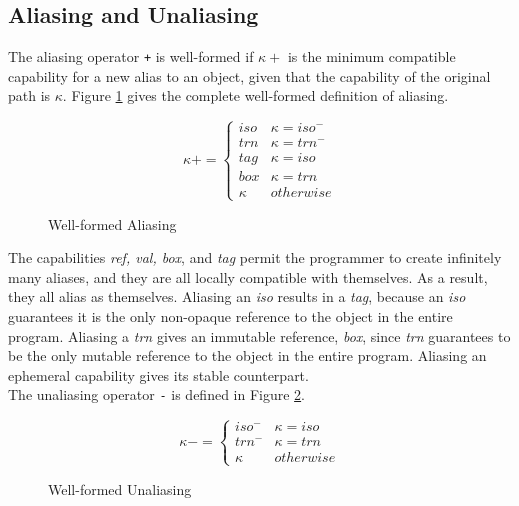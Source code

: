 \subsection{Aliasing and Unaliasing}

The aliasing operator \texttt{+} is well-formed if $\kappa+$ is the minimum compatible capability for a new alias to an object, given that the capability of the original path is $\kappa$. Figure \ref{fig:degen-alias} gives the complete well-formed definition of aliasing.

\begin{figure}[H]
    \centering
    \[ \kappa+ = \begin{cases}
        \textit{iso} & \kappa = \textit{iso}^- \\
        \textit{trn} & \kappa = \textit{trn}^- \\
        \textit{tag} & \kappa = \textit{iso} \\
        \textit{box} & \kappa = \textit{trn} \\
        \kappa & otherwise
       \end{cases}
    \]
    \caption{Well-formed Aliasing}
    \label{fig:degen-alias}
\end{figure}

The capabilities \textit{ref, val, box}, and \textit{tag} permit the programmer to create infinitely many aliases, and they are all locally compatible with themselves. As a result, they all alias as themselves. Aliasing an \textit{iso} results in a \textit{tag}, because an \textit{iso} guarantees it is the only non-opaque reference to the object in the entire program. Aliasing a \textit{trn} gives an immutable reference, \textit{box}, since \textit{trn} guarantees to be the only mutable reference to the object in the entire program. Aliasing an ephemeral capability gives its stable counterpart. \\

The unaliasing operator \texttt{-} is defined in Figure \ref{fig:degen-unalias}. 

\begin{figure}[H]
    \centering
    \[ \kappa- = \begin{cases}
        \textit{iso}^- & \kappa = \textit{iso} \\
        \textit{trn}^- & \kappa = \textit{trn} \\
        \kappa & otherwise
       \end{cases}
    \]
    \caption{Well-formed Unaliasing}
    \label{fig:degen-unalias}
\end{figure}

